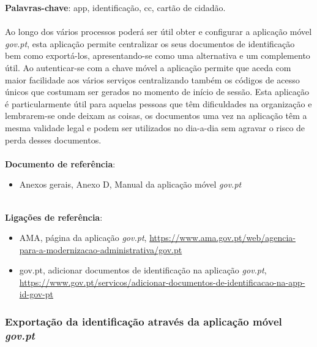 \textbf{Palavras-chave}: app, identificação, cc, cartão de cidadão. \\
\\
Ao longo dos vários processos poderá ser útil obter e configurar a
aplicação móvel \emph{gov.pt}, esta aplicação permite centralizar os
seus documentos de identificação bem como exportá-los, apresentando-se
como uma alternativa e um complemento útil. Ao autenticar-se com a chave
móvel a aplicação permite que aceda com maior facilidade aos vários
serviços centralizando também os códigos de acesso únicos que costumam
ser gerados no momento de início de sessão. Esta aplicação é
particularmente útil para aquelas pessoas que têm dificuldades na
organização e lembrarem-se onde deixam as coisas, os documentos uma vez
na aplicação têm a mesma validade legal e podem ser utilizados no
dia-a-dia sem agravar o risco de perda desses documentos. \\
\\
\textbf{Documento de referência}:
\begin{itemize}
	\item Anexos gerais, Anexo D, Manual da aplicação móvel \emph{gov.pt}
\end{itemize}
\leavevmode\\
\textbf{Ligações de referência}:
\begin{itemize}
	\item AMA, página da aplicação \emph{gov.pt}, \url{https://www.ama.gov.pt/web/agencia-para-a-modernizacao-administrativa/gov.pt}
	\item gov.pt, adicionar documentos de identificação na aplicação \emph{gov.pt}, \url{https://www.gov.pt/servicos/adicionar-documentos-de-identificacao-na-app-id-gov-pt}
\end{itemize}

\subsubsection{\texorpdfstring{Exportação da identificação através da aplicação móvel \emph{gov.pt}}{Exportação da identificação através da aplicação móvel gov.pt}}

